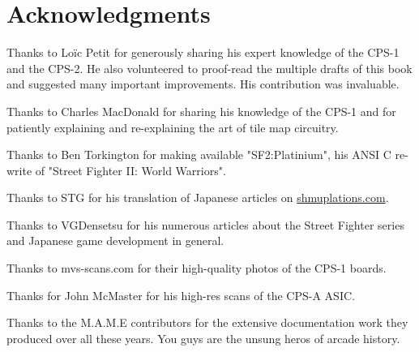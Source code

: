 \chapter*{Acknowledgments} 

Thanks to Lo\"{i}c Petit for generously sharing his expert knowledge of the CPS-1 and the CPS-2. He also volunteered to proof-read the multiple drafts of this book and suggested many important improvements. His contribution was invaluable.

Thanks to Charles MacDonald for sharing his knowledge of the CPS-1 and for patiently explaining and re-explaining the art of tile map circuitry.

Thanks to Ben Torkington for making available "SF2:Platinium", his ANSI C re-write of "Street Fighter II: World Warriors".

Thanks to STG for his translation of Japanese articles on \href{https://shmuplations.com}{shmuplations.com}.

Thanks to VGDensetsu for his numerous articles about the Street Fighter series and Japanese game development in general.

Thanks to mvs-scans.com for their high-quality photos of the CPS-1 boards.

Thanks for John McMaster for his high-res scans of the CPS-A ASIC.

Thanks to the M.A.M.E contributors for the extensive documentation work they produced over all these years. You guys are the unsung heros of arcade history.